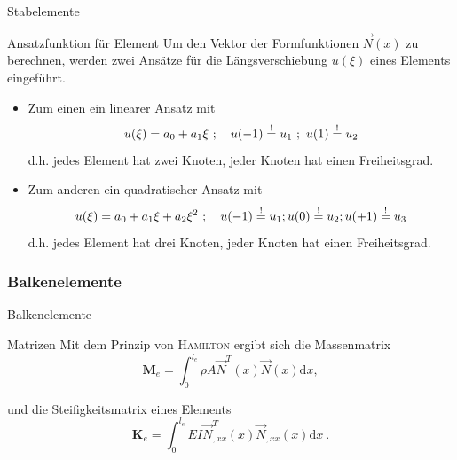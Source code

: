 \begin{frame}{Stabelemente}
	\begin{block}{Ansatzfunktion für Element}
		Um den Vektor der Formfunktionen $\vec{N}(x)$ zu berechnen, werden zwei Ansätze für die Längsverschiebung $ u(\xi) $ eines Elements eingeführt.\\
		\begin{itemize}
			\item Zum einen ein linearer Ansatz mit
			\begin{equation*}
			\setlength\abovedisplayskip{1.5pt}
			\setlength\belowdisplayskip{1.5pt}
			u(\xi)=a_{0}+a_{1}\xi \ ; \quad u(-1) \overset{!}{=} u_{1} \ ; \  u(1) \overset{!}{=} u_{2}
			\end{equation*} 
			d.h. jedes Element hat zwei Knoten, jeder Knoten hat einen Freiheitsgrad. \\
			\item Zum anderen ein quadratischer Ansatz mit
			\begin{equation*}
			\setlength\abovedisplayskip{1.5pt}
			\setlength\belowdisplayskip{1.5pt}
			u(\xi) = a_{0} + a_{1} \xi + a_{2} \xi^{2} \ ; \quad u(-1) \overset{!}{=} u_{1}  ;  u(0) \overset{!}{=} u_{2}  ;  u(+1) \overset{!}{=} u_{3}
			\end{equation*}
			d.h. jedes Element hat drei Knoten, jeder Knoten hat einen Freiheitsgrad.
		\end{itemize}

		
	\end{block}
\end{frame}

\subsubsection*{Balkenelemente}
\begin{frame}{Balkenelemente}
	\begin{exampleblock}{Matrizen}
		Mit dem Prinzip von \textsc{Hamilton} ergibt sich die Massenmatrix
		\begin{equation*}
		\mathbf{M}_{e} = \int_{0}^{l_{e}} \rho A \vec{N}^{T}(x) \vec{N}(x) \mathrm{d}x ,
		\end{equation*}
		
		und die Steifigkeitsmatrix eines Elements
		\begin{equation*}
		\mathbf{K}_{e} = \int_{0}^{l_{e}} EI \vec{N}_{,xx}^{T}(x) \vec{N}_{,xx}(x) \mathrm{d}x \ .
		\end{equation*}
	\end{exampleblock}
\end{frame}

